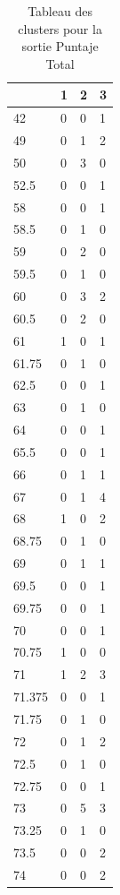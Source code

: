 \begin{table}[H]
	\centering
	\caption{Tableau des clusters pour la sortie Puntaje Total}
	\label{my-label}
	\begin{tabular}{llll}
		& 1  & 2  & 3  \\
		\hline
		42     & 0  & 0  & 1  \\
		49     & 0  & 1  & 2  \\
		50     & 0  & 3  & 0  \\
		52.5   & 0  & 0  & 1  \\
		58     & 0  & 0  & 1  \\
		58.5   & 0  & 1  & 0  \\
		59     & 0  & 2  & 0  \\
		59.5   & 0  & 1  & 0  \\
		60     & 0  & 3  & 2  \\
		60.5   & 0  & 2  & 0  \\
		61     & 1  & 0  & 1  \\
		61.75  & 0  & 1  & 0  \\
		62.5   & 0  & 0  & 1  \\
		63     & 0  & 1  & 0  \\
		64     & 0  & 0  & 1  \\
		65.5   & 0  & 0  & 1  \\
		66     & 0  & 1  & 1  \\
		67     & 0  & 1  & 4  \\
		68     & 1  & 0  & 2  \\
		68.75  & 0  & 1  & 0  \\
		69     & 0  & 1  & 1  \\
		69.5   & 0  & 0  & 1  \\
		69.75  & 0  & 0  & 1  \\
		70     & 0  & 0  & 1  \\
		70.75  & 1  & 0  & 0  \\
		71     & 1  & 2  & 3  \\
		71.375 & 0  & 0  & 1  \\
		71.75  & 0  & 1  & 0  \\
		72     & 0  & 1  & 2  \\
		72.5   & 0  & 1  & 0  \\
		72.75  & 0  & 0  & 1  \\
		73     & 0  & 5  & 3  \\
		73.25  & 0  & 1  & 0  \\
		73.5   & 0  & 0  & 2  \\
		74     & 0  & 0  & 2  \\

\end{tabular}
\end{table}
